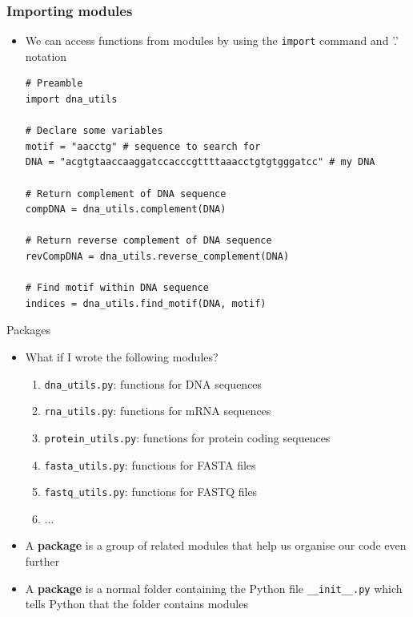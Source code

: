 \documentclass[xcolor=table]{beamer}
\begin{document}
\begin{frame}[fragile]
\frametitle{Importing modules}

\begin{itemize}\addtolength{\itemsep}{\baselineskip}

	\item We can access functions from modules by using the \texttt{import} command
	and '.' notation

\begin{lstlisting}[style=python]
# Preamble
import dna_utils

# Declare some variables
motif = "aacctg" # sequence to search for
DNA = "acgtgtaaccaaggatccacccgttttaaacctgtgtgggatcc" # my DNA

# Return complement of DNA sequence
compDNA = dna_utils.complement(DNA)

# Return reverse complement of DNA sequence
revCompDNA = dna_utils.reverse_complement(DNA)

# Find motif within DNA sequence 
indices = dna_utils.find_motif(DNA, motif)
\end{lstlisting}

\end{itemize}

\end{frame}

\begin{frame}{Packages}

\begin{itemize}\addtolength{\itemsep}{\baselineskip}
	\item<1-> What if I wrote the following modules?
	\begin{enumerate}
		\item<2-> \texttt{dna\_utils.py}: {\scriptsize functions for DNA sequences}
		\item<3-> \texttt{rna\_utils.py}: {\scriptsize functions for mRNA sequences}
		\item<4-> \texttt{protein\_utils.py}: {\scriptsize functions for protein coding sequences}
		\item<5-> \texttt{fasta\_utils.py}: {\scriptsize functions for FASTA files}
		\item<6-> \texttt{fastq\_utils.py}: {\scriptsize functions for FASTQ files}
		\item<6-> ...
	\end{enumerate}

	\item<7-> A \textbf{package} is a group of related modules that help us organise our code
	even further

	\item<8-> A \textbf{package} is a normal folder containing the Python file \texttt{\_\_init\_\_.py} 
	which tells Python that the folder contains modules  
\end{itemize}

\end{frame}
\end{document}
